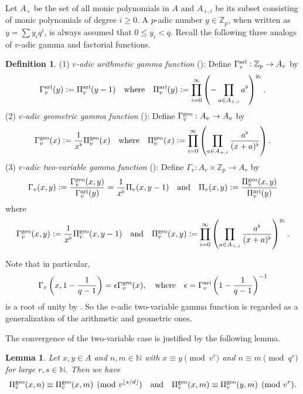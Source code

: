 \documentclass[11pt]{amsart}
\theoremstyle{plain}
\newtheorem{lem}[thm]{Lemma}
\theoremstyle{definition}
\newtheorem{defn}[thm]{Definition}
\theoremstyle{remark}
\numberwithin{equation}{section}
\newcommand{\ZZ}{\mathbb{Z}}
\newcommand{\NN}{\mathbb{N}}
\newcommand{\floor}[1]{\lfloor #1 \rfloor}
\newcommand{\Ami}{A_{+,i}}
\newcommand{\vaf}{\Pi_v^{\textnormal{ari}}}
\newcommand{\vag}{\Gamma_v^{\textnormal{ari}}}
\newcommand{\vgf}{\Pi_v^{\textnormal{geo}}}
\newcommand{\vgg}{\Gamma_v^{\textnormal{geo}}}
\newcommand{\vtf}{\Pi_v}
\newcommand{\vtg}{\Gamma_v}
\begin{document}
	Let $A_+$ be the set of all monic polynomials in $A$ and $\Ami$ be its subset consisting of monic polynomials of degree $i\geq 0$.
	A $p$-adic number $y \in \ZZ_p$, when written as $y = \sum y_i q^i$, is always assumed that $0\leq y_i < q$.
	Recall the following three analogs of $v$-adic gamma and factorial functions.
	
	\begin{defn}    \label{v-adic-gamma-definition}
		(1) \textit{$v$-adic arithmetic gamma function} (\cite[Appendix]{goss1980modular}): Define $\vag: \ZZ_p \to A_v$ by
		$$
		\vag (y) := \vaf(y-1)
		\quad
		\text{where}
		\quad
		\vaf(y) := \prod_{i=0}^{\infty} \left( -\prod_{a\in \Ami} a^\flat \right)^{y_i}.
		$$
		(2) \textit{$v$-adic geometric gamma function} (\cite[Section 5]{thakur1991gamma}): Define $\vgg: A_v \to A_v$ by
		$$
		\vgg(x) := \frac{1}{x^\flat} \vgf(x)
		\quad
		\text{where}
		\quad
		\vgf(x) := \prod_{i=0}^{\infty} \left( \prod_{a\in \Ami} \frac{a^\flat}{(x+a)^\flat} \right).
		$$
		(3) \textit{$v$-adic two-variable gamma function} (\cite[Subsection 9.9]{goss1996basic}): Define $\vtg: A_v \times \ZZ_p \to A_v$ by
		$$
		\vtg(x,y)
		:= \frac{\vgg(x,y)}{\vag(y)}
		= \frac{1}{x^\flat} \vtf(x,y-1)
		\quad
		\text{and}
		\quad
		\vtf(x,y)
		:= \frac{\vgf(x,y)}{\vaf(y)}
		$$
		where
		$$
		\vgg(x,y) := \frac{1}{x^\flat} \vgf(x,y-1)
		\quad
		\text{and}
		\quad
		\vgf(x,y) := \prod_{i=0}^\infty \left( \prod_{a\in\Ami} \frac{a^\flat}{(x+a)^\flat} \right)^{y_i}.
		$$
	\end{defn}
	Note that in particular,
	$$
	\vtg\left(x , 1-\frac{1}{q-1}\right) 
	= \epsilon \vgg(x),
	\quad
	\text{where}
	\quad
	\epsilon = \vag\left(1-\frac{1}{q-1}\right)^{-1}
	$$
	is a root of unity by \cite[Theorem 4.4]{thakur1991gamma}.
	So the $v$-adic two-variable gamma function is regarded as a generalization of the arithmetic and geometric ones.
	
	The convergence of the two-variable case is justified by the following lemma.
	
	\begin{lem}
		Let $x,y\in A$ and $n,m\in\NN$ with $x\equiv y \pmod{v^r}$ and $n\equiv m\pmod{q^s}$ for large $r,s \in \NN$.
		Then we have
		$$
		\vgf(x,n) \equiv \vgf(x,m) \pmod{v^{\floor{s/d}}}
		\quad
		\text{and}
		\quad
		\vgf(x,m) \equiv \vgf(y,m) \pmod{v^r}.
		$$
	\end{lem}
	
\end{document}
